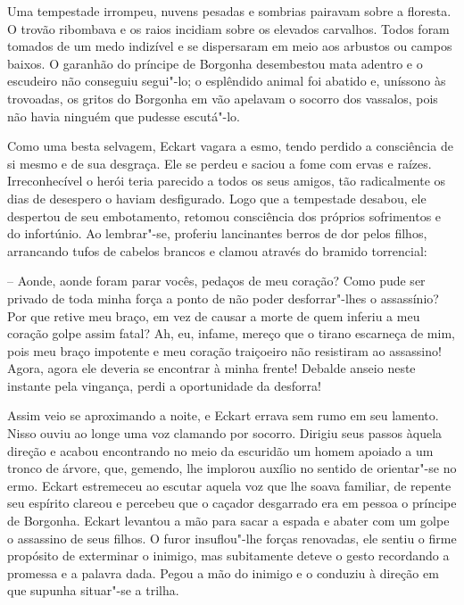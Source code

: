  Uma tempestade irrompeu, nuvens pesadas e sombrias pairavam sobre a
floresta. O trovão ribombava e os raios incidiam sobre os elevados
carvalhos. Todos foram tomados de um medo indizível e se dispersaram em
meio aos arbustos ou campos baixos. O garanhão do príncipe de Borgonha
desembestou mata adentro e o escudeiro não conseguiu segui"-lo; o
esplêndido animal foi abatido e, uníssono às trovoadas, os gritos do
Borgonha em vão apelavam o socorro dos vassalos, pois não havia ninguém
que pudesse escutá"-lo.

 Como uma besta selvagem, Eckart vagara a esmo, tendo perdido a
consciência de si mesmo e de sua desgraça. Ele se perdeu e saciou a
fome com ervas e raízes. Irreconhecível o herói teria parecido a todos
os seus amigos, tão radicalmente os dias de desespero o haviam
desfigurado. Logo que a tempestade desabou, ele despertou de seu
embotamento, retomou consciência dos próprios sofrimentos e do
infortúnio. Ao lembrar"-se, proferiu lancinantes berros de dor pelos
filhos, arrancando tufos de cabelos brancos e clamou através do bramido
torrencial:
 
 -- Aonde, aonde foram parar vocês, pedaços de meu coração? Como pude ser
privado de toda minha força a ponto de não poder desforrar"-lhes o
assassínio? Por que retive meu braço, em vez de causar a morte de quem
inferiu a meu coração golpe assim fatal? Ah, eu, infame, mereço que o
tirano escarneça de mim, pois meu braço impotente e meu coração
traiçoeiro não resistiram ao assassino! Agora, agora ele deveria se
encontrar à minha frente! Debalde anseio neste instante pela vingança,
perdi a oportunidade da desforra!

 Assim veio se aproximando a noite, e Eckart errava sem rumo em seu
lamento. Nisso ouviu ao longe uma voz clamando por socorro. Dirigiu
seus passos àquela direção e acabou encontrando no meio da escuridão um
homem apoiado a um tronco de árvore, que, gemendo, lhe implorou auxílio
no sentido de orientar"-se no ermo. Eckart estremeceu ao escutar aquela
voz que lhe soava familiar, de repente seu espírito clareou e percebeu
que o caçador desgarrado era em pessoa o príncipe de Borgonha. Eckart
levantou a mão para sacar a espada e abater com um golpe o 
assassino de seus filhos. O furor insuflou"-lhe forças renovadas, ele
sentiu o firme propósito de exterminar o inimigo, mas subitamente
deteve o gesto recordando a promessa e a palavra dada. Pegou a mão do
inimigo e o conduziu à direção em que supunha situar"-se a trilha.

